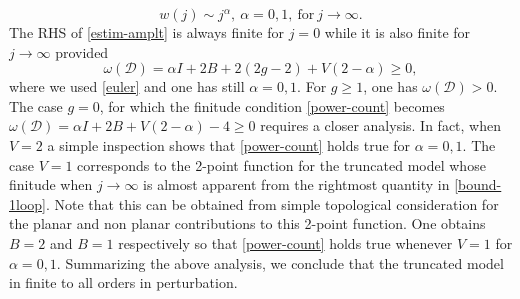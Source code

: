 \documentclass[a4paper,11pt,twoside]{article}
\numberwithin{equation}{section}
\theoremstyle{nonumberplain}
\newcounter{and}
\begin{document}
\begin{equation}
w(j)\sim j^\alpha,\ \alpha=0,1,\ {\text{for}}\  j\to\infty.\label{alpha-values}
\end{equation}
The RHS of \eqref{estim-amplt} is always finite for $j=0$ while it is also finite for $j\to\infty$ provided%
\begin{equation}
\omega(\mathcal{D})=\alpha I+2B+2(2g-2)+V(2-\alpha)\ge0,\label{power-count}
\end{equation}
where we used \eqref{euler} and one has still $\alpha=0,1$. For $g\ge1$, one has $\omega(\mathcal{D})>0$. The case $g=0$, for which the finitude condition \eqref{power-count} becomes $\omega(\mathcal{D})=\alpha I+2B+V(2-\alpha)-4\ge0$ requires a closer analysis. In fact, when $V=2$ a simple inspection shows that \eqref{power-count} holds true for $\alpha=0,1$. The case $V=1$ corresponds to the 2-point function for the truncated model whose finitude when $j\to\infty$ is almost apparent from the rightmost quantity in \eqref{bound-1loop}. Note that this can be obtained from simple topological consideration for the planar and non planar contributions to this 2-point function. One obtains $B=2$ and $B=1$ respectively so that \eqref{power-count} holds true whenever $V=1$ for $\alpha=0,1$. Summarizing the above analysis, we conclude that the truncated model in finite to all orders in perturbation.\par
\end{document}
